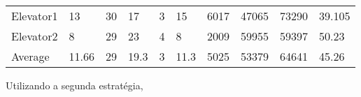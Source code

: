 ﻿\documentclass[a4paper]{article}
\begin{document}
\begin{table}[h]
\begin{tabular}{@{}llllllllll@{}}
Elevator1 & 13        & 30            &  17           & 3                                                               & 15                                                                  & 6017                                                         & 47065                                                 & 73290                                                   & 39.105         \\
Elevator2 & 8        & 29            & 23           & 4                                                               & 8                                                                  & 2009                                                         & 59955                                                 & 59397                                                   & 50.23         \\
Average   & 11.66     & 29         & 19.3        & 3                                                              & 11.3                                                            & 5025                                                         & 53379                                                 & 64641                                                   & 45.26         \\ \bottomrule
\end{tabular}
\end{table}

\newpage

Utilizando a segunda estratégia,
\end{document}
